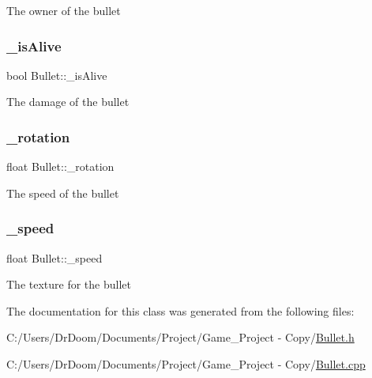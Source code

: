 The owner of the bullet \mbox{\label{class_bullet_a493d2187e18321e4777e3681c5ee07a6}} 
\subsubsection{\texorpdfstring{\+\_\+is\+Alive}{\_isAlive}}
{\footnotesize\ttfamily bool Bullet\+::\+\_\+is\+Alive\hspace{0.3cm}{\ttfamily [private]}}

The damage of the bullet \mbox{\label{class_bullet_a1904e460221accb69ae194fc4eb7d54f}} 
\subsubsection{\texorpdfstring{\+\_\+rotation}{\_rotation}}
{\footnotesize\ttfamily float Bullet\+::\+\_\+rotation\hspace{0.3cm}{\ttfamily [private]}}

The speed of the bullet \mbox{\label{class_bullet_a6a971a89bb69a7e9d5be0955e78d12a5}} 
\subsubsection{\texorpdfstring{\+\_\+speed}{\_speed}}
{\footnotesize\ttfamily float Bullet\+::\+\_\+speed\hspace{0.3cm}{\ttfamily [private]}}

The texture for the bullet 

The documentation for this class was generated from the following files\+:\begin{DoxyCompactItemize}
\item 
C\+:/\+Users/\+Dr\+Doom/\+Documents/\+Project/\+Game\+\_\+\+Project -\/ Copy/\hyperlink{_bullet_8h}{Bullet.\+h}\item 
C\+:/\+Users/\+Dr\+Doom/\+Documents/\+Project/\+Game\+\_\+\+Project -\/ Copy/\hyperlink{_bullet_8cpp}{Bullet.\+cpp}\end{DoxyCompactItemize}
